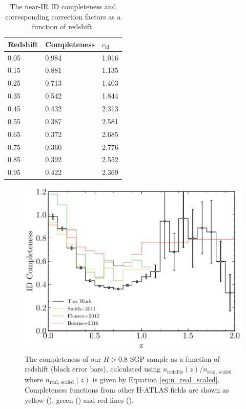 \begin{table}
    \centering
    \begin{tabular}{p{4.5cm}|p{2.5cm}|p{2.5cm}}
        \hline
        \hline
        Redshift & Completeness & $c_{\textrm{id}}$ \\
        \hline
        \hline
        0.05 & 0.984 & 1.016 \\
        0.15 & 0.881 & 1.135 \\
        0.25 & 0.713 & 1.403 \\
        0.35 & 0.542 & 1.844 \\
        0.45 & 0.432 & 2.313 \\
        0.55 & 0.387 & 2.581 \\
        0.65 & 0.372 & 2.685 \\
        0.75 & 0.360 & 2.776 \\
        0.85 & 0.392 & 2.552 \\
        0.95 & 0.422 & 2.369 \\
        \hline
    \end{tabular}
    \caption[Near-IR completeness as a function of redshift]{The near-IR ID completeness and corresponding correction factors as a function of redshift.}
    \label{tab:id_completeness_table}
\end{table}

\begin{figure}
	\centering
	\includegraphics[width=0.75\columnwidth]{Figures/id_completeness.pdf}
	\caption[Completeness of our reliable SGP sample as a function of redshift]{The completeness of our $R > 0.8$ SGP sample as a function of redshift (black error bars), calculated using $n_{\textrm{reliable}}(z)/n_{\textrm{real, scaled}}$ where $n_{\textrm{real, scaled}}(z)$ is given by Equation \ref{eq:n_real_scaled}. Completeness functions from other H-ATLAS fields are shown as yellow (\citealt{Smith_2011}), green (\citealt{Fleuren_2012}) and red lines (\citealt{Bourne_2016}).}
	\label{fig:id_completeness}
\end{figure}

